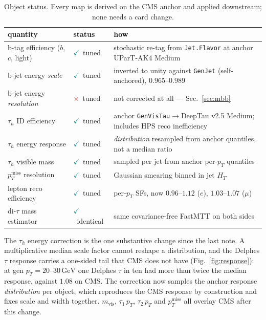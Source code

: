\documentclass[11pt,a4paper]{article}
\newcommand{\tauh}{\tau_{h}}
\newcommand{\mvis}{m_{\mathrm{vis}}}
\newcommand{\ptmiss}{p_{T}^{\mathrm{miss}}}
\newcommand{\yes}{\textcolor{teal}{$\checkmark$}}
\newcommand{\no}{\textcolor{red}{$\times$}}
\begin{document}
\begin{table}[htbp]
\centering\small
\begin{tabular}{llp{6.3cm}}
\toprule
quantity & status & how \\
\midrule
b-tag efficiency ($b$, $c$, light) & \yes\ tuned & stochastic re-tag from \texttt{Jet.Flavor} at anchor UParT-AK4 Medium \\
b-jet energy \emph{scale}          & \yes\ tuned & inverted to unity against \texttt{GenJet} (self-anchored), $0.965$--$0.989$ \\
b-jet energy \emph{resolution}     & \no\ tuned  & not corrected at all --- Sec.~\ref{sec:mbb} \\
$\tauh$ ID efficiency              & \yes\ tuned & anchor \texttt{GenVisTau}$\rightarrow$DeepTau v2.5 Medium; includes HPS reco inefficiency \\
$\tauh$ energy response            & \yes\ tuned & \emph{distribution} resampled from anchor quantiles, not a median ratio \\
$\tauh$ visible mass               & \yes\ tuned & sampled per jet from anchor per-$p_{T}$ quantiles \\
$\ptmiss$ resolution               & \yes\ tuned & Gaussian smearing binned in jet $H_{T}$ \\
lepton reco efficiency             & \yes\ tuned & per-$p_{T}$ SFs, now $0.96$--$1.12$ ($e$), $1.03$--$1.07$ ($\mu$) \\
di-$\tau$ mass estimator           & \yes\ identical & same covariance-free FastMTT on both sides \\
\bottomrule
\end{tabular}
\caption{Object status. Every map is derived on the CMS anchor and applied downstream;
none needs a card change.\label{tab:tuning}}
\end{table}

The $\tauh$ energy correction is the one substantive change since the last note. A
multiplicative median scale factor cannot reshape a distribution, and the Delphes $\tau$
response carries a one-sided tail that CMS does not have (Fig.~\ref{fig:response}): at gen
$p_{T}=20$--$30\,\si{\GeV}$ one Delphes $\tau$ in ten had more than twice the median
response, against $1.08$ on CMS. The correction now samples the anchor response
\emph{distribution} per object, which reproduces the CMS response by construction and fixes
scale and width together. $\mvis$, $\tau_{1}\,p_{T}$, $\tau_{2}\,p_{T}$ and $\ptmiss$ all
overlay CMS after this change.
\end{document}
